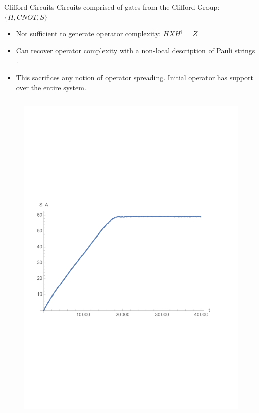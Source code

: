 \begin{frame}{Clifford Circuits}
    Circuits comprised of gates from the Clifford Group: $\{H, CNOT, S\}$

    \begin{itemize}
        \item Not sufficient to generate operator complexity: $H X H^{\dagger} = Z$
        \item Can recover operator complexity with a non-local description of Pauli strings \cite{Blake_2020}.
        \item This sacrifices any notion of operator spreading. Initial operator has support over the entire system.
    \end{itemize}

    \begin{columns}
        \begin{column}{0.475\textwidth}
            \begin{figure}
            \vspace{-3cm}
            \includegraphics[width = \textwidth]{QS_Images/BAL_Result.pdf}
        \end{figure}
        \end{column}


\end{columns}
\end{frame}
